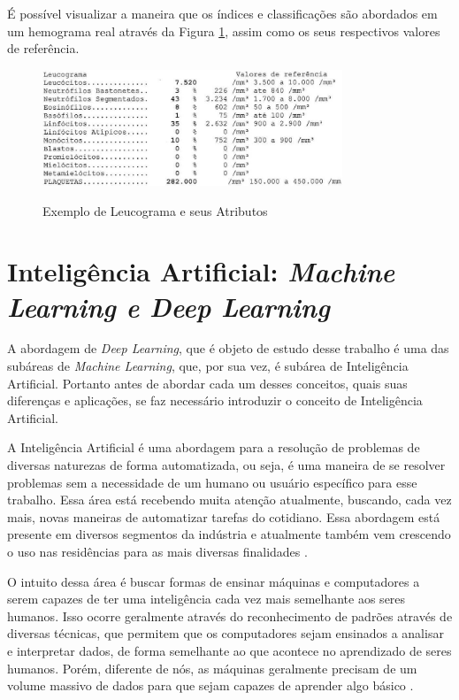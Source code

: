 É possível visualizar a maneira que os índices e classificações são abordados em um hemograma real através da Figura \ref{fig:leucograma}, assim como os seus respectivos valores de referência.

\begin{figure}[!htb]
	\centering
	\caption{Exemplo de Leucograma e seus Atributos}
	\includegraphics[width=0.80\textwidth]{img/leucograma.jpg}
	\label{fig:leucograma}
\end{figure}

\section{Inteligência Artificial: \emph{Machine Learning e Deep Learning}}
\label{sec:conceito2}
A abordagem de \emph{Deep Learning}, que é objeto de estudo desse trabalho é uma das subáreas de \emph{Machine Learning}, que, por sua vez, é subárea de Inteligência Artificial. Portanto antes de abordar cada um desses conceitos, quais suas diferenças e aplicações, se faz necessário introduzir o conceito de Inteligência Artificial.

A Inteligência Artificial é uma abordagem para a resolução de problemas de diversas naturezas de forma automatizada, ou seja, é uma maneira de se resolver problemas sem a necessidade de um humano ou usuário específico para esse trabalho. Essa área está recebendo muita atenção atualmente, buscando, cada vez mais, novas maneiras de automatizar tarefas do cotidiano. Essa abordagem está presente em diversos segmentos da indústria e atualmente também vem crescendo o uso nas residências para as mais diversas finalidades \cite{inteligenciaArtificial}.

O intuito dessa área é buscar formas de ensinar máquinas e computadores a serem capazes de ter uma inteligência cada vez mais semelhante aos seres humanos. Isso ocorre geralmente através do reconhecimento de padrões através de diversas técnicas, que permitem que os computadores sejam ensinados a analisar e interpretar dados, de forma semelhante ao que acontece no aprendizado de seres humanos. Porém, diferente de nós, as máquinas geralmente precisam de um volume massivo de dados para que sejam capazes de aprender algo básico \cite{IAAprendizadoMaquina}.

